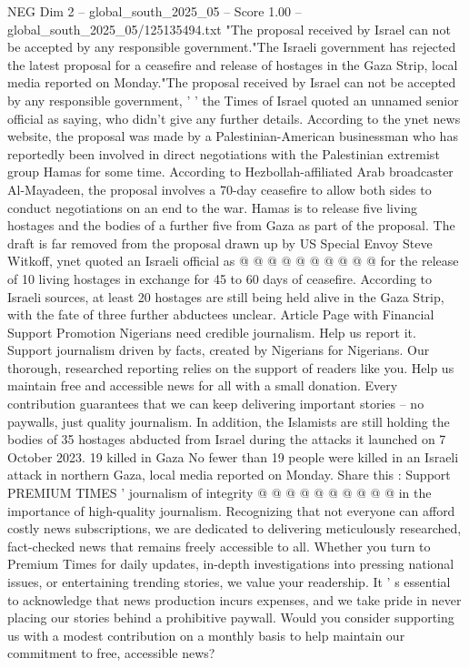 \begin{textsample}{NEG Dim 2 – global\_south\_2025\_05 – Score 1.00 – global\_south\_2025\_05/125135494.txt}  \label{ex:f2_neg_404}
"The proposal received by Israel can not be accepted by any responsible government."The Israeli government has rejected the latest proposal for a ceasefire and release of hostages in the Gaza Strip, local media reported on Monday."The proposal received by Israel can not be accepted by any responsible government, ' ' the Times of Israel quoted an unnamed senior official as saying, who didn't give any further details.
According to the ynet news website, the proposal was made by a Palestinian-American businessman who has reportedly been involved in direct negotiations with the Palestinian extremist group Hamas for some time.
According to Hezbollah-affiliated Arab broadcaster Al-Mayadeen, the proposal involves a 70-day ceasefire to allow both sides to conduct negotiations on an end to the war.
Hamas is to release five living hostages and the bodies of a further five from Gaza as part of the proposal.
The draft is far removed from the proposal drawn up by US Special Envoy Steve Witkoff, ynet quoted an Israeli official as @ @ @ @ @ @ @ @ @ @ for the release of 10 living hostages in exchange for 45 to 60 days of ceasefire.
According to Israeli sources, at least 20 hostages are still being held alive in the Gaza Strip, with the fate of three further abductees unclear.
Article Page with Financial Support Promotion Nigerians need credible journalism.
Help us report it.
Support journalism driven by facts, created by Nigerians for Nigerians.
Our thorough, researched reporting relies on the support of readers like you.
Help us maintain free and accessible news for all with a small donation.
Every contribution guarantees that we can keep delivering important stories -- no paywalls, just quality journalism.
In addition, the Islamists are still holding the bodies of 35 hostages abducted from Israel during the attacks it launched on 7 October 2023. 19 killed in Gaza No fewer than 19 people were killed in an Israeli attack in northern Gaza, local media reported on Monday.
Share this : Support PREMIUM TIMES ' journalism of integrity @ @ @ @ @ @ @ @ @ @ in the importance of high-quality journalism.
Recognizing that not everyone can afford costly news subscriptions, we are dedicated to delivering meticulously researched, fact-checked news that remains freely accessible to all.
Whether you turn to Premium Times for daily updates, in-depth investigations into pressing national issues, or entertaining trending stories, we value your readership.
It ' s essential to acknowledge that news production incurs expenses, and we take pride in never placing our stories behind a prohibitive paywall.
Would you consider supporting us with a modest contribution on a monthly basis to help maintain our commitment to free, accessible news?

\end{textsample}
